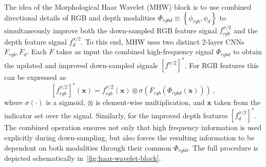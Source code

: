 \documentclass{article}
\begin{document}
The idea of the Morphological Haar Wavelet (MHW) block is to use combined directional details of RGB and depth modalities $\Phi_{rgbd} \equiv \left\{\phi_{rgb}, \phi_{d}\right\}$ to simultaneously improve both the down-sampled RGB feature signal $f^{\sigma/2}_{rgb}$ and the depth feature signal $f^{\sigma/2}_{d}$.
To this end, MHW uses two distinct 2-layer CNNs $F_{rgb}, F_{d}$.
Each $F$ takes as input the combined high-frequency signal $\Phi_{rgbd}$ to obtain the updated and improved down-sampled signals $[f^{\sigma/2}]^{*}$. 
For RGB features this can be expressed as
\begin{equation}
    \left[f_{rgb}^{\sigma/2}\right]^{*}(\mathbf{x}) = f^{\sigma/2}_{rgb} (\mathbf{x}) \otimes \sigma\left(F_{rgb}\left(\Phi_{rgbd}\left(\mathbf{x}\right)\right)\right) \,,
\end{equation}
where $\sigma(\cdot)$ is a sigmoid, $\otimes$ is element-wise multiplication, and $\mathbf{x}$ taken from the indicator set over the signal. 
Similarly, for the improved depth features $[f_{d}^{\sigma/2}]^{*}$. 
The combined operation ensures not only that high frequency information is used explicitly during down-sampling, but also forces the resulting information to be dependent on both modalities through their common $\Phi_{rgbd}$.
The full procedure is depicted schematically in~\autoref{fig:haar-wavelet-block}.
\end{document}
